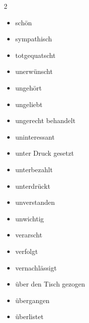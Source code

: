\begin{multicols}{2}
\begin{itemize}
        \item schön
        \item sympathisch
        \item totgequatscht
        \item unerwünscht
        \item ungehört
        \item ungeliebt
        \item ungerecht behandelt
        \item uninteressant
        \item unter Druck gesetzt
        \item unterbezahlt
        \item unterdrückt
        \item unverstanden
        \item unwichtig
        \item verarscht
        \item verfolgt
        \item vernachlässigt
        \item über den Tisch gezogen
        \item übergangen
        \item überlistet
    \end{itemize}
\end{multicols}
